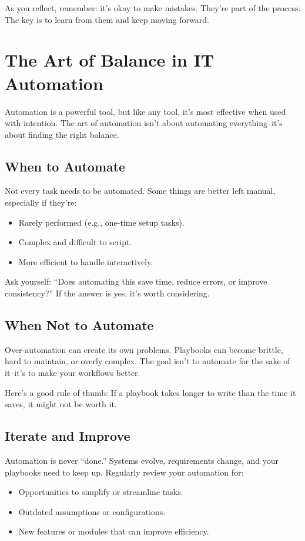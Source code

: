 As you reflect, remember: it's okay to make mistakes. They're part of the process. The key is to learn from them and keep moving forward.


\section{The Art of Balance in IT Automation}

Automation is a powerful tool, but like any tool, it's most effective when used with intention. The art of automation isn't about automating everything--it's about finding the right balance.

\subsection{When to Automate}

Not every task needs to be automated. Some things are better left manual, especially if they're:
\begin{itemize}
    \item Rarely performed (e.g., one-time setup tasks).
    \item Complex and difficult to script.
    \item More efficient to handle interactively.
\end{itemize}

Ask yourself: “Does automating this save time, reduce errors, or improve consistency?” If the answer is yes, it's worth considering.

\subsection{When Not to Automate}

Over-automation can create its own problems. Playbooks can become brittle, hard to maintain, or overly complex. The goal isn't to automate for the sake of it--it's to make your workflows better.

Here's a good rule of thumb: If a playbook takes longer to write than the time it saves, it might not be worth it.

\subsection{Iterate and Improve}

Automation is never “done.” Systems evolve, requirements change, and your playbooks need to keep up. Regularly review your automation for:
\begin{itemize}
    \item Opportunities to simplify or streamline tasks.
    \item Outdated assumptions or configurations.
    \item New features or modules that can improve efficiency.
\end{itemize}


